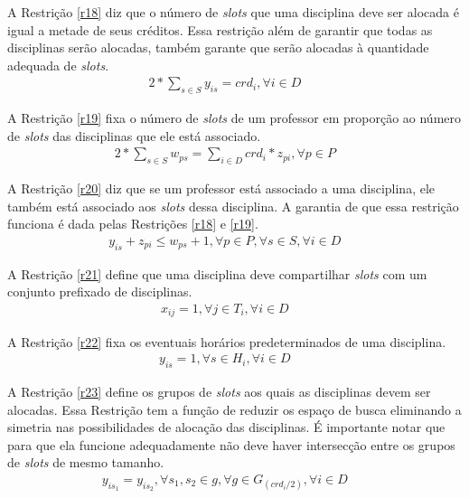 A Restrição \ref{r18} diz que o número de \textit{slots} que uma disciplina deve ser alocada é igual a metade de seus créditos. Essa restrição além de garantir que todas as disciplinas serão alocadas, também garante que serão alocadas à quantidade adequada de \textit{slots}.
\begin{eqnarray}
\label{r18}
2*\sum_{s \in S}^{}{y_{is}} = crd_i, \forall{i}\in{D}  &&
\end{eqnarray}

A Restrição \ref{r19} fixa o número de \textit{slots} de um professor em proporção ao número de \textit{slots} das disciplinas que ele está associado.
\begin{eqnarray}
\label{r19}
2 * \sum_{s \in S}^{}{w_{ps}} = \sum_{i \in D}^{}{crd_i * z_{pi}}, \forall{p}\in{P} &&
\end{eqnarray}

A Restrição \ref{r20} diz que se um professor está associado a uma disciplina, ele também está associado aos \textit{slots} dessa disciplina. A garantia de que essa restrição funciona é dada pelas Restrições \ref{r18} e \ref{r19}. 
\begin{eqnarray}
\label{r20}
y_{is} + z_{pi} \le w_{ps} + 1, \forall{p}\in{P}, \forall{s}\in{S}, \forall{i}\in{D} &&
\end{eqnarray}

A Restrição \ref{r21} define que uma disciplina deve compartilhar \textit{slots} com um conjunto prefixado de disciplinas.
\begin{eqnarray}
\label{r21}
x_{ij} = 1, \forall{j\in{T_i}},\forall{i \in{D}} &&
\end{eqnarray}

A Restrição \ref{r22} fixa os eventuais horários predeterminados de uma disciplina.
\begin{eqnarray}
\label{r22}
y_{is} = 1, \forall{s \in{H_i}}, \forall{i \in{D}} &&
\end{eqnarray}

A Restrição \ref{r23} define os grupos de \textit{slots} aos quais as disciplinas devem ser alocadas. Essa Restrição tem a função de reduzir os espaço de busca eliminando a simetria nas possibilidades de alocação das disciplinas. É importante notar que para que ela funcione adequadamente não deve haver intersecção entre os grupos de \textit{slots} de mesmo tamanho.
\begin{eqnarray}
\label{r23}
y_{is_1} = y_{is_2}, \forall{s_1, s_2\in{g}}, \forall{g\in{G_{(crd_i/2)}}}, \forall{i\in{D}} &&
\end{eqnarray}

